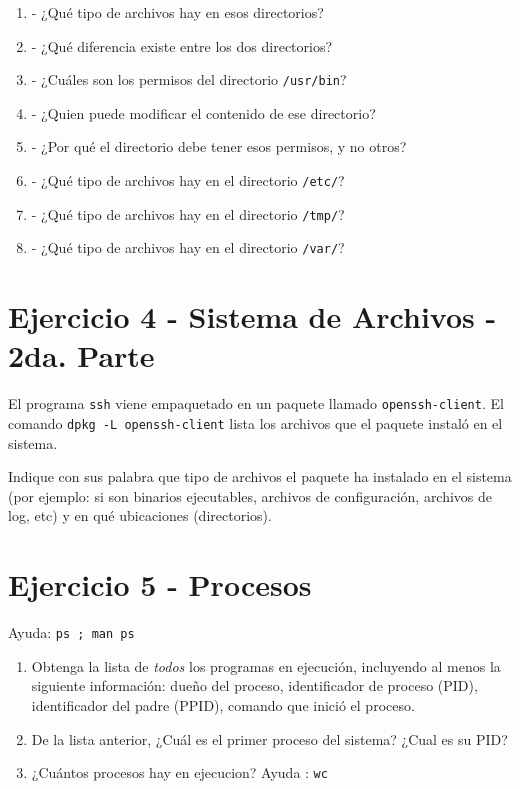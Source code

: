 \documentclass[12pt]{article}
\begin{document}
\begin{enumerate}
\item - ¿Qué tipo de archivos hay en esos directorios?
\item - ¿Qué diferencia existe entre los dos directorios?
\item - ¿Cuáles son los permisos del directorio \texttt{/usr/bin}?
\item - ¿Quien puede modificar el contenido de ese directorio?
\item - ¿Por qué el directorio debe tener esos permisos, y no otros?
\item - ¿Qué tipo de archivos hay en el directorio \texttt{/etc/}?

\item - ¿Qué tipo de archivos hay en el directorio \texttt{/tmp/}?

\item - ¿Qué tipo de archivos hay en el directorio \texttt{/var/}?
\end{enumerate}

\section*{Ejercicio 4 - Sistema de Archivos - 2da. Parte}
El programa \texttt{ssh} viene empaquetado en un paquete llamado \texttt{openssh-client}.
El comando \texttt{dpkg -L openssh-client} lista los archivos que el paquete instaló en el sistema.

Indique con sus palabra que tipo de archivos el paquete ha instalado en el sistema (por ejemplo: si son binarios ejecutables, archivos de configuración, archivos de log, etc) y en qué ubicaciones (directorios).

\section*{Ejercicio 5 - Procesos}
Ayuda: \texttt{ps ; man ps}
\begin{enumerate}
\item Obtenga la lista de \textit{todos} los programas en ejecución, incluyendo al menos la siguiente información:
dueño del proceso, identificador de proceso (PID), identificador del padre (PPID),
comando que inició el proceso.
\item De la lista anterior, ¿Cuál es el primer proceso del sistema? ¿Cual es su PID?
\item ¿Cuántos procesos hay en ejecucion? Ayuda : \texttt{wc}
\end{enumerate}
\end{document}
